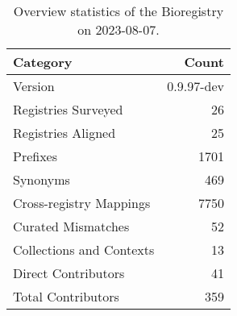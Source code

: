 \begin{table}
\caption{Overview statistics of the Bioregistry on 2023-08-07.}
\label{tab:bioregistry-summary}
\begin{tabular}{lr}
\toprule
Category & Count \\
\midrule
Version & 0.9.97-dev \\
Registries Surveyed & 26 \\
Registries Aligned & 25 \\
Prefixes & 1701 \\
Synonyms & 469 \\
Cross-registry Mappings & 7750 \\
Curated Mismatches & 52 \\
Collections and Contexts & 13 \\
Direct Contributors & 41 \\
Total Contributors & 359 \\
\bottomrule
\end{tabular}
\end{table}
